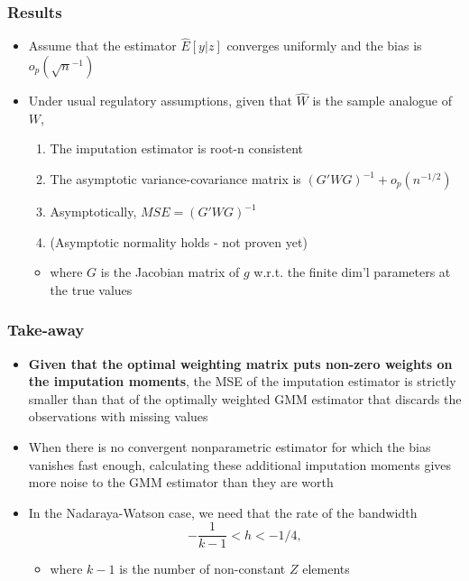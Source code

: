 \documentclass[compress,mathserif]{beamer}
\begin{document}
\begin{frame}\frametitle{Results}\hypertarget{Results}{}
\begin{itemize}
\item Assume that the estimator $\hat{E}[y|z]$ converges uniformly and the bias is 
$o_p(\sqrt{n}^{-1})$

\item Under usual regulatory assumptions, given that $\hat{W}$ is the sample analogue of $W$,
\begin{enumerate}
\item The imputation estimator is root-n consistent
\item The asymptotic variance-covariance matrix is $(G'WG)^{-1}+o_p(n^{-1/2})$
\item Asymptotically, $MSE=(G'WG)^{-1}$
\item (Asymptotic normality holds - not proven yet)
\end{enumerate}
\begin{itemize}
\item where $G$ is the Jacobian matrix of $g$ w.r.t. the finite dim'l parameters at the true values


\end{itemize}

\end{itemize}
\end{frame}



\begin{frame}\frametitle{Take-away}\hypertarget{Take-away}{}
\begin{itemize}
\item \textbf{Given that the optimal weighting matrix puts non-zero weights on the imputation moments}, the MSE of the imputation estimator is strictly smaller than that of the optimally weighted GMM estimator that discards the observations with missing values

\item When there is no convergent nonparametric estimator for which the bias vanishes fast enough, calculating these additional imputation moments gives more noise to the GMM estimator than they are worth

\item In the Nadaraya-Watson case, we need that the rate of the bandwidth
\[-\frac{1}{k-1}<h<-1/4,
\]  
\begin{itemize}
\item where $k-1$ is the number of non-constant $Z$ elements


\end{itemize}

\end{itemize}
\end{frame}
\end{document}
